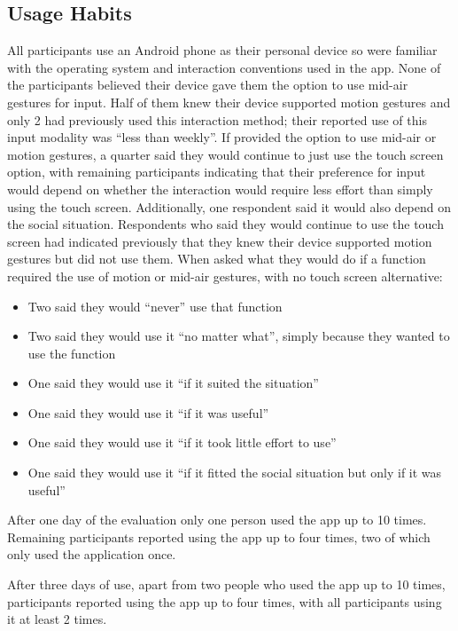 \documentclass{l4proj}
\begin{document}
\subsection{Usage Habits}

All participants use an Android phone as their personal device so were familiar with the operating system and interaction conventions used in the app. None of the participants believed their device gave them the option to use mid-air gestures for input. Half of them knew their device supported motion gestures and only 2 had previously used this interaction method; their reported use of this input modality was ``less than weekly''. If provided the option to use mid-air or motion gestures, a quarter said they would continue to just use the touch screen option, with remaining participants indicating that their preference for input would depend on whether the interaction would require less effort than simply using the touch screen. Additionally, one respondent said it would also depend on the social situation. Respondents who said they would continue to use the touch screen had indicated previously that they knew their device supported motion gestures but did not use them. When asked what they would do if a function required the use of motion or mid-air gestures, with no touch screen alternative:\begin{itemize}
    \item Two said they would ``never'' use that function
    \item Two said they would use it ``no matter what'', simply because they wanted to use the function
    \item One said they would use it ``if it suited the situation''
    \item One said they would use it ``if it was useful''
    \item One said they would use it ``if it took little effort to use''
    \item One said they would use it ``if it fitted the social situation but only if it was useful''
\end{itemize}

After one day of the evaluation only one person used the app up to 10 times. Remaining participants reported using the app up to four times, two of which only used the application once. 

After three days of use, apart from two people who used the app up to 10 times, participants reported using the app up to four times, with all participants using it at least 2 times. 
\end{document}
